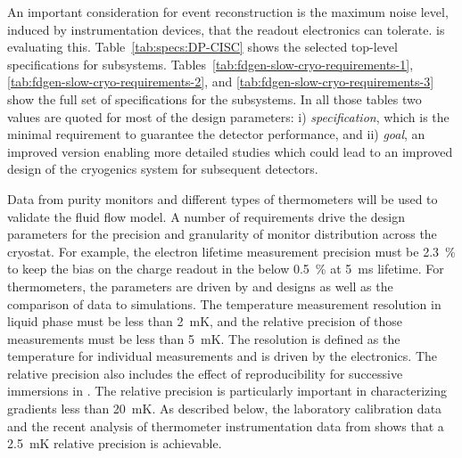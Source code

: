 An important consideration for event reconstruction is the maximum noise level, induced by instrumentation devices, that the readout electronics  can tolerate.  is evaluating this. Table~\ref{tab:specs:DP-CISC} shows the selected top-level specifications for  subsystems. 
Tables~\ref{tab:fdgen-slow-cryo-requirements-1}, \ref{tab:fdgen-slow-cryo-requirements-2}, and \ref{tab:fdgen-slow-cryo-requirements-3} show the full set of specifications
for the  subsystems. In all those tables two values are quoted for most of the design parameters: i) {\it specification}, which is the minimal requirement to guarantee the detector performance, and ii) {\it goal},  an improved version enabling more detailed studies which could lead to an improved design of the cryogenics system for subsequent detectors. 

Data from purity monitors and different types of thermometers will be used to validate the \lar fluid flow model. 
A number of requirements drive the design parameters for the precision and granularity of monitor distribution across the cryostat. 
For example, the electron lifetime measurement precision must be \SI{2.3}{\%} to keep the bias on the charge readout in the  below \SI{0.5}{\%} at \SI{5}{ms} lifetime.
 For thermometers, the 
parameters are driven by  and   designs as well as the comparison of  data to  simulations. The temperature measurement resolution in liquid phase must be less than \SI{2}{mK}, and the relative precision of those measurements must be less than \SI{5}{mK}. The resolution is defined as the temperature  for individual measurements and is driven by the electronics. The relative precision also includes the effect of reproducibility for successive immersions in . 
The relative precision is particularly important in characterizing %
gradients less than \SI{20}{mK}. %
As described below, the laboratory calibration data and the recent analysis of thermometer instrumentation data from  shows that a \SI{2.5}{mK} relative precision is achievable. 


